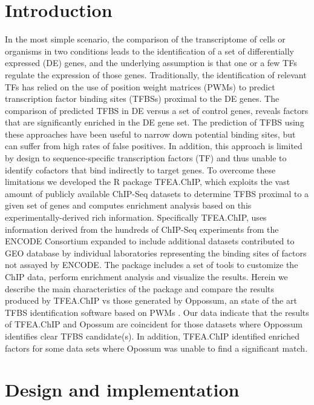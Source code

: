 \documentclass[10pt,letterpaper]{article}
\begin{document}
	\section*{Introduction}
	In the most simple scenario, the comparison of the transcriptome of cells or organisms in two conditions leads to the identification of a set of differentially expressed (DE) genes, and the underlying assumption is that one or a few TFs regulate the expression of those genes. Traditionally, the identification of relevant TFs has relied on the use of position weight matrices (PWMs) to predict transcription factor binding sites (TFBSs) proximal to the DE genes\cite{Wasserman}. The comparison of predicted TFBS in DE versus a set of control genes, reveals factors that are significantly enriched in the DE gene set. The prediction of TFBS using these approaches have been useful to narrow down potential binding sites, but can suffer from high rates of false positives. In addition, this approach is limited by design to sequence-specific transcription factors (TF) and thus unable to identify cofactors that bind indirectly to target genes. To overcome these limitations we developed the R package TFEA.ChIP, which exploits the vast amount of publicly available ChIP-Seq datasets to determine TFBS proximal to a given set of genes and computes enrichment analysis based on this experimentally-derived rich information. Specifically TFEA.ChIP, uses information derived from the hundreds of ChIP-Seq experiments from the ENCODE Consortium\cite{ENCODE} expanded to include additional datasets contributed to GEO database\cite{GEO1}\cite{GEO2} by individual laboratories representing the binding sites of factors not assayed by ENCODE. The package includes a set of tools to customize the ChIP data, perform enrichment analysis and visualize the results. Herein we describe the main characteristics of the package and compare the results produced by TFEA.ChIP vs those generated by Oppossum, an state of the art TFBS identification software based on PWMs \cite{Kwon2012}. Our data indicate that the results of TFEA.ChIP and Opossum are coincident for those datasets where Oppossum identifies clear TFBS candidate(s). In addition, TFEA.ChIP identified enriched factors for some data sets where Opossum was unable to find a significant match.
	
	\section*{Design and implementation}
\end{document}
